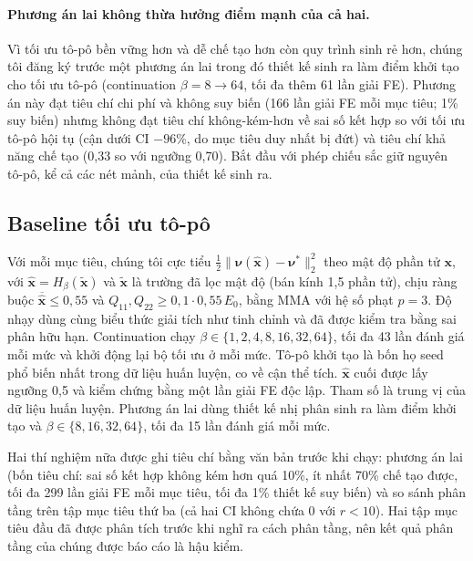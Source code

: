 \paragraph{Phương án lai không thừa hưởng điểm mạnh của cả hai.}
Vì tối ưu tô-pô bền vững hơn và dễ chế tạo hơn còn quy trình sinh rẻ hơn,
chúng tôi đăng ký trước một phương án lai trong đó thiết kế sinh ra làm điểm
khởi tạo cho tối ưu tô-pô (continuation $\beta=8\to64$, tối đa thêm 61 lần
giải FE). Phương án này đạt tiêu chí chi phí và không suy biến (166 lần giải
FE mỗi mục tiêu; 1\% suy biến) nhưng không đạt tiêu chí không-kém-hơn về sai
số kết hợp so với tối ưu tô-pô hội tụ (cận dưới CI $-96\%$, do mục tiêu duy
nhất bị đứt) và tiêu chí khả năng chế tạo (0,33 so với ngưỡng 0,70). Bắt đầu
với phép chiếu sắc giữ nguyên tô-pô, kể cả các nét mảnh, của thiết kế sinh ra.

\subsection{Baseline tối ưu tô-pô}
Với mỗi mục tiêu, chúng tôi cực tiểu
$\tfrac12\lVert\boldsymbol\nu(\hat{\mathbf x})-\boldsymbol\nu^{*}\rVert_2^2$
theo mật độ phần tử $\mathbf x$, với $\hat{\mathbf x}=H_\beta(\tilde{\mathbf x})$
và $\tilde{\mathbf x}$ là trường đã lọc mật độ (bán kính 1,5 phần tử), chịu
ràng buộc $\overline{\hat{\mathbf x}}\le0{,}55$ và
$Q_{11},Q_{22}\ge0{,}1\cdot0{,}55\,E_0$, bằng MMA \citep{svanberg1987mma} với
hệ số phạt $p=3$. Độ nhạy dùng cùng biểu thức giải tích như tinh chỉnh và đã
được kiểm tra bằng sai phân hữu hạn. Continuation chạy
$\beta\in\{1,2,4,8,16,32,64\}$, tối đa 43 lần đánh giá mỗi mức và khởi động
lại bộ tối ưu ở mỗi mức. Tô-pô khởi tạo là bốn họ seed phổ biến nhất trong dữ
liệu huấn luyện, co về cận thể tích. $\hat{\mathbf x}$ cuối được lấy ngưỡng 0,5
và kiểm chứng bằng một lần giải FE độc lập. Tham số là trung vị của dữ liệu
huấn luyện. Phương án lai dùng thiết kế nhị phân sinh ra làm điểm khởi tạo và
$\beta\in\{8,16,32,64\}$, tối đa 15 lần đánh giá mỗi mức.

Hai thí nghiệm nữa được ghi tiêu chí bằng văn bản trước khi chạy: phương án
lai (bốn tiêu chí: sai số kết hợp không kém hơn quá 10\%, ít nhất 70\% chế tạo
được, tối đa 299 lần giải FE mỗi mục tiêu, tối đa 1\% thiết kế suy biến) và so
sánh phân tầng trên tập mục tiêu thứ ba (cả hai CI không chứa 0 với $r<10$).
Hai tập mục tiêu đầu đã được phân tích trước khi nghĩ ra cách phân tầng, nên
kết quả phân tầng của chúng được báo cáo là hậu kiểm.

